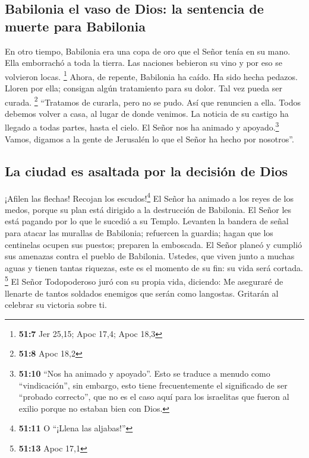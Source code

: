 \hypertarget{babilonia-el-vaso-de-dios-la-sentencia-de-muerte-para-babilonia}{%
\subsection{Babilonia el vaso de Dios: la sentencia de muerte para
Babilonia}\label{babilonia-el-vaso-de-dios-la-sentencia-de-muerte-para-babilonia}}

 En otro tiempo, Babilonia era una copa de oro que el
Señor tenía en su mano. Ella emborrachó a toda la tierra. Las naciones
bebieron su vino y por eso se volvieron locas. \footnote{\textbf{51:7}
  Jer 25,15; Apoc 17,4; Apoc 18,3}  Ahora, de repente,
Babilonia ha caído. Ha sido hecha pedazos. Lloren por ella; consigan
algún tratamiento para su dolor. Tal vez pueda ser curada. \footnote{\textbf{51:8}
  Apoc 18,2}  ``Tratamos de curarla, pero no se pudo. Así
que renuncien a ella. Todos debemos volver a casa, al lugar de donde
venimos. La noticia de su castigo ha llegado a todas partes, hasta el
cielo.  El Señor nos ha animado y apoyado.\footnote{\textbf{51:10}
  ``Nos ha animado y apoyado''. Esto se traduce a menudo como
  ``vindicación'', sin embargo, esto tiene frecuentemente el significado
  de ser ``probado correcto'', que no es el caso aquí para los
  israelitas que fueron al exilio porque no estaban bien con Dios.}
Vamos, digamos a la gente de Jerusalén lo que el Señor ha hecho por
nosotros''.

\hypertarget{la-ciudad-es-asaltada-por-la-decisiuxf3n-de-dios}{%
\subsection{La ciudad es asaltada por la decisión de
Dios}\label{la-ciudad-es-asaltada-por-la-decisiuxf3n-de-dios}}

 ¡Afilen las flechas! Recojan los escudos!\footnote{\textbf{51:11}
  O ``¡Llena las aljabas!''} El Señor ha animado a los reyes de los
medos, porque su plan está dirigido a la destrucción de Babilonia. El
Señor les está pagando por lo que le sucedió a su Templo.
 Levanten la bandera de señal para atacar las murallas de
Babilonia; refuercen la guardia; hagan que los centinelas ocupen sus
puestos; preparen la emboscada. El Señor planeó y cumplió sus amenazas
contra el pueblo de Babilonia.  Ustedes, que viven junto
a muchas aguas y tienen tantas riquezas, este es el momento de su fin:
su vida será cortada. \footnote{\textbf{51:13} Apoc 17,1}
 El Señor Todopoderoso juró con su propia vida, diciendo:
Me aseguraré de llenarte de tantos soldados enemigos que serán como
langostas. Gritarán al celebrar su victoria sobre ti.


